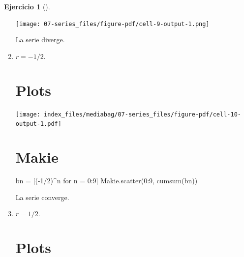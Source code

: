 \documentclass[
  a4paper,
]{scrreport}
\newenvironment{Shaded}{\begin{snugshade}}{\end{snugshade}}
\newcommand{\FloatTok}[1]{\textcolor[rgb]{0.68,0.00,0.00}{#1}}
\newcommand{\FunctionTok}[1]{\textcolor[rgb]{0.28,0.35,0.67}{#1}}
\newcommand{\NormalTok}[1]{\textcolor[rgb]{0.00,0.23,0.31}{#1}}
\newcommand{\OperatorTok}[1]{\textcolor[rgb]{0.37,0.37,0.37}{#1}}
\newcommand{\SpecialCharTok}[1]{\textcolor[rgb]{0.37,0.37,0.37}{#1}}
\newcommand{\StringTok}[1]{\textcolor[rgb]{0.13,0.47,0.30}{#1}}
\theoremstyle{definition}
\newtheorem{exercise}{Ejercicio}[chapter]
\theoremstyle{remark}
\begin{document}
\begin{exercise}[]
\begin{tcolorbox}
\begin{enumerate}
  \texttt{[image: 07-series\_files/figure-pdf/cell-9-output-1.png]}

  La serie diverge.
\item
  \(r=-1/2\).

  \section{Plots}

\begin{Shaded}
\end{Shaded}

  \texttt{[image: index\_files/mediabag/07-series\_files/figure-pdf/cell-10-output-1.pdf]}

  \section{Makie}

\begin{Shaded}
\begin{Highlighting}[]
\NormalTok{bn = [({-}1/2)\^{}n for n = 0:9]}
\NormalTok{Makie.scatter(0:9, cumsum(bn))}
\end{Highlighting}
\end{Shaded}

  La serie converge.
\item
  \(r=1/2\).

  \section{Plots}

\begin{Shaded}
\end{Shaded}


\end{enumerate}
\end{tcolorbox}
\end{exercise}
\end{document}
